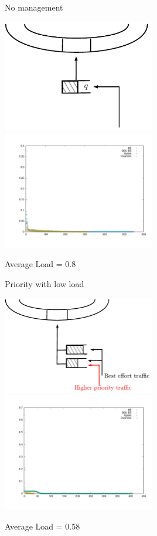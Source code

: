 \documentclass[10 pt]{beamer}
\begin{document}
\begin{frame}{No management}

\includegraphics[width=0.5\textwidth]{insertion0.pdf}
\includegraphics[width=0.5\textwidth]{No_managment_low.pdf}

\centering Average Load = 0.8

\end{frame}


\begin{frame}{Priority with low load}

\includegraphics[width=0.5\textwidth]{insertion1.pdf}
\includegraphics[width=0.5\textwidth]{Priority_low.pdf}

\centering Average Load = 0.58

\end{frame}
\end{document}
